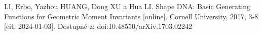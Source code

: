 \begin{thebibliography}{99}
		LI, Erbo, Yazhou HUANG, Dong XU a Hua LI. Shape DNA: Basic Generating Functions for Geometric Moment Invariants [online]. Cornell University, 2017, 3-8 [cit. 2024-01-03]. Dostupné z: doi:10.48550/arXiv.1703.02242
%  
%  
%  
%  
%  
%  
%  
%  
%  
\end{thebibliography}


